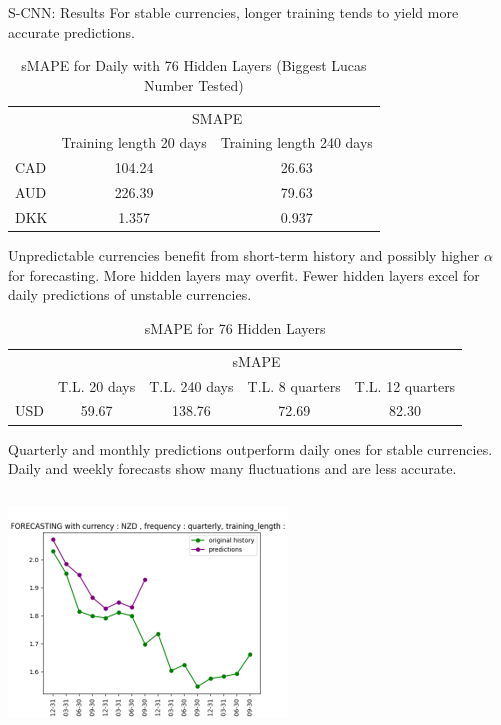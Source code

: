 \documentclass[aspectratio=169, 12pt]{beamer}
\begin{document}
\begin{frame}[allowframebreaks]{S-CNN: Results}
For stable currencies, longer training tends to yield more accurate predictions.
\begin{table}[htbp]
\centering
\caption{sMAPE for Daily with 76 Hidden Layers (Biggest Lucas Number Tested)}
\begin{tabular}{lcc}
\toprule
& \multicolumn{2}{c}{SMAPE} \\
\cmidrule{2-3}
& Training length 20 days & Training length 240 days \\
\midrule
CAD & 104.24 & 26.63 \\
AUD & 226.39 & 79.63 \\
DKK & 1.357 & 0.937 \\
\bottomrule
\end{tabular}
\end{table}
Unpredictable currencies benefit from short-term history and possibly higher $\alpha$ for forecasting. More hidden layers may overfit. Fewer hidden layers excel for daily predictions of unstable currencies.
\begin{table}[htbp]
\centering
\caption{sMAPE for 76 Hidden Layers}
\begin{tabular}{lcccc}
\toprule
& \multicolumn{4}{c}{sMAPE} \\
\cmidrule{2-5}
& T.L. 20 days & T.L. 240 days & T.L. 8 quarters & T.L. 12 quarters \\
\midrule
USD & 59.67 & 138.76 & 72.69 & 82.30 \\
\bottomrule
\end{tabular}
\end{table}
Quarterly and monthly predictions outperform daily ones for stable currencies. Daily and weekly forecasts show many fluctuations and are less accurate.
\begin{columns}
    \begin{column}{0.25\textwidth}
        \includegraphics[width=\linewidth]{plots/r1.png}

\end{column}
\end{columns}
\end{frame}
\end{document}
